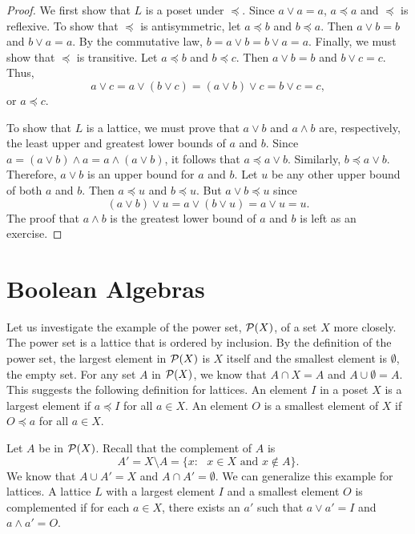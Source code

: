  
\begin{proof}
We first show that $L$ is a poset under $\preceq$. Since $a \vee a =
a$, $a \preceq a$ and $\preceq$ is reflexive. To show that $\preceq$
is antisymmetric, let $a \preceq b$ and $b \preceq a$. Then $a \vee b
= b$ and $b \vee a = a$.  By the commutative law, $b = a \vee b
= b \vee a = a$.   Finally, we must show that $\preceq$ is
transitive. Let $a \preceq b$ and $b \preceq c$. Then $a \vee b = b$
and $b \vee c = c$.  Thus,
$$
a \vee c = a \vee (b \vee c ) = ( a \vee b) \vee c = b \vee c = c,
$$
or $a \preceq c$.
 
To show that $L$ is a lattice, we must prove that $a \vee b$ and $a
\wedge b$ are, respectively, the least upper and greatest lower bounds
of $a$ and $b$. Since $a=(a \vee b) \wedge a = a \wedge (a \vee b)$,
it follows that $a \preceq a \vee b$.  Similarly, $b \preceq a \vee
b$. Therefore, $a \vee b$ is an upper bound for $a$ and $b$. Let $u$
be any other upper bound of both $a$ and $b$. Then $a \preceq u$ and
$b \preceq u$. But $a \vee b \preceq u$ since 
$$
(a \vee b) \vee u = a \vee (b \vee u) = a \vee u = u.
$$
The proof that $a \wedge b$ is the greatest lower bound of $a$ and
$b$ is left as an exercise.
\end{proof}
 
 
 
\section{Boolean Algebras}
 
 
Let us investigate the example of the power set, ${\cal P}(X)$, of a
set $X$ more  closely. The power set is a lattice that is  ordered by
inclusion. By the definition of the power set, the largest element in
${\cal P}(X)$ is $X$ itself and the smallest element is $\emptyset$,
the empty set. For any set $A$ in ${\cal P}(X)$, we know that $A \cap
X = A$ and $A \cup \emptyset = A$. This suggests the following
definition for lattices. An element $I$\label{notelargeposet} 
in a poset $X$ is a {\bfi
largest element\/} if $a \preceq I$ for
all $a \in X$.  An element $O$\label{notesmallposet} 
 is a  {\bfi smallest
element\/} of $X$ if $O \preceq a$ for
all $a \in X$.  
 
 
Let $A$ be in ${\cal P}(X)$. Recall that the complement of $A$ is
$$
A' = X \setminus A = \{ x : \mbox{ $x \in X$ and $x \notin A$}  \}.
$$
We know that $A \cup A' = X$ and $A \cap A' = \emptyset$. We can
generalize this example for lattices. A lattice $L$ with a largest
element $I$ and a smallest element $O$ is {\bfi
complemented\/} if for each $a \in X$, there
exists an $a'$\label{notedlatticecomp} 
such that $a \vee a' = I$ and $a \wedge a' = O$.
 
